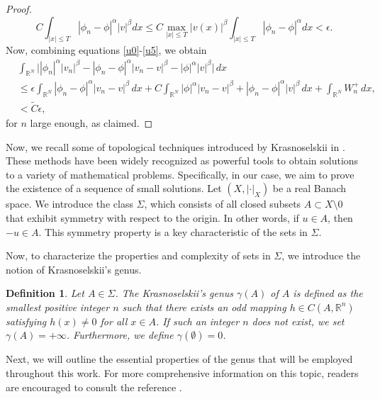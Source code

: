 \documentclass[10pt,a4paper]{amsart}
\numberwithin{equation}{section}
\newtheorem{definition}[theo]{Definition}
\begin{document}
\begin{proof}
\begin{equation}
C\int_{|x|\leq T}|\phi_n-\phi|^\alpha|v|^\beta dx\leq C \max_{|x|\leq T}|v(x)|^\beta \int_{|x|\leq T}|\phi_n-\phi|^\alpha dx<\epsilon.
\end{equation}
Now, combining equations \eqref{u0}-\eqref{u5}, we obtain
\begin{align*}
&\int_{\mathbb{R}^N}\Big||\phi_n|^\alpha|v_n|^\beta-|\phi_n-\phi|^\alpha|v_n-v|^\beta
 -|\phi|^\alpha|v|^\beta\Big|\,dx\\
&\leq \epsilon \int_{\mathbb{R}^N}|\phi_n-\phi|^\alpha|v_n-v|^\beta\,dx
+C\int_{\mathbb{R}^N}|\phi|^\alpha|v_n-v|^\beta+|\phi_n-\phi|^\alpha|v|^\beta\,dx
+\int_{\mathbb{R}^N} W_n^+\,dx,\\
&< \tilde{C}\epsilon,
\end{align*}
for $n$ large enough, as claimed.
\end{proof}

Now, we recall some of topological techniques introduced by Krasnoselskii in \cite{cc}. 
These methods have been widely recognized as powerful tools to obtain solutions to 
a variety of mathematical problems. Specifically, in our case, we aim to prove the 
existence of a sequence of small solutions. Let $(X,|\cdot|_X)$ be a real Banach space. 
We introduce the class $\Sigma$, which consists of all closed subsets 
$A\subset X\setminus{0}$ that exhibit symmetry with respect to the origin. 
In other words, if $u\in A$, then $-u\in A$. This symmetry property is a key 
characteristic of the sets in $\Sigma$.

Now,  to characterize the properties and complexity of sets in $\Sigma$, 
we introduce the notion of Krasnoselskii's genus.

\begin{definition}\label{genus} \rm
Let $A\in \Sigma$. The Krasnoselskii's genus $\gamma(A)$ of $A$ is defined as the 
smallest positive integer $n$ such that there exists an odd mapping 
$h\in C(A,\mathbb{R}^n)$ satisfying $h(x)\neq 0$ for all $x\in A$. 
If such an integer $n$ does not exist, we set $\gamma(A)=+\infty$. Furthermore, 
we define $\gamma(\emptyset)=0$.
\end{definition}

Next, we will outline the essential properties of the genus that will be 
employed throughout this work. For more comprehensive information on this topic, 
readers are encouraged to consult the reference \cite{cc}.
\end{document}
